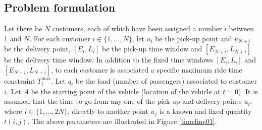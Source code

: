 \documentclass[dissertation,draft*]{aaltoseries}
\begin{document}
\subsection{Problem formulation \cite{psaraftis01,psaraftis02}}
\label{staticnarrow}
Let there be $N$ customers, each of which have been assigned a number $i$ between 1 and $N$.
For each customer $i \in \{1,\ldots,N\}$, let $u_i$ be the pick-up point and $u_{N+i}$ be the delivery point,
$[E_i,L_i]$ be the pick-up time window and $[E_{N+i},L_{N+i}]$ be the delivery time window. 
In addition to the fixed time windows $[E_i,L_i]$ and $[E_{N+i},L_{N+i}]$, to each 
customer is associated a specific maximum ride time constraint $T_i^{\max}$. 
Let $q_i$ be the load (number of passengers) associated to customer $i$. 
Let $A$ be the starting point of the vehicle (location of the vehicle at $t=0$).
It is assumed that the time to go from any one of the pick-up and delivery points 
$u_i$, where $i \in \{1, \ldots, 2N\}$, directly to another point $u_{j}$ is a 
known and fixed quantity $t(i,j)$.
The above parameters are illustrated in Figure \ref{timeline01}.
\end{document}
